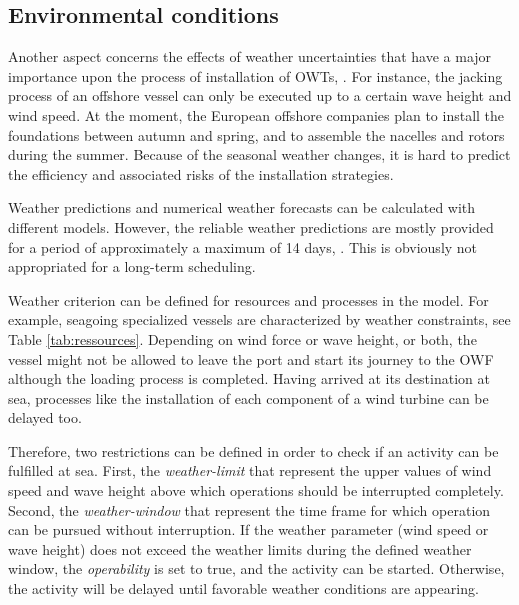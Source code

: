 \subsection{Environmental conditions}
Another aspect concerns the effects of weather uncertainties that have a major importance upon the process of installation of OWTs, \cite{COMPIT11}. For instance, the jacking process of an offshore vessel can only be executed up to a certain wave height and wind speed. At the moment, the European offshore companies plan to install the foundations between autumn and spring, and to assemble the nacelles and rotors during the summer. Because of the seasonal weather changes, it is hard to predict the efficiency and associated risks of the installation strategies.

Weather predictions and numerical weather forecasts can be calculated with different models. However, the reliable weather predictions are mostly provided for a period of approximately a maximum of 14 days, \cite{Hinnenthal_2010}. This is obviously not appropriated for a long-term scheduling.

Weather criterion can be defined for resources and processes in the model. For example, seagoing specialized vessels are characterized by weather constraints, see Table \ref{tab:ressources}. Depending on wind force or wave height, or both, the vessel might not be allowed to leave the port and start its journey to the OWF although the loading process is completed. Having arrived at its destination at sea, processes like the installation of each component of a wind turbine can be delayed too.

Therefore, two restrictions can be defined in order to check if an activity can be fulfilled at sea. First, the \textit{weather-limit} that represent the upper values of wind speed and wave height above which operations should be interrupted completely. Second, the \textit{weather-window} that represent the time frame for which operation can be pursued without interruption.  If the weather parameter (wind speed or wave height) does not exceed the weather limits during the defined weather window, the \textit{operability} is set to true, and the activity can be started. Otherwise, the activity will be delayed until favorable weather conditions are appearing.

